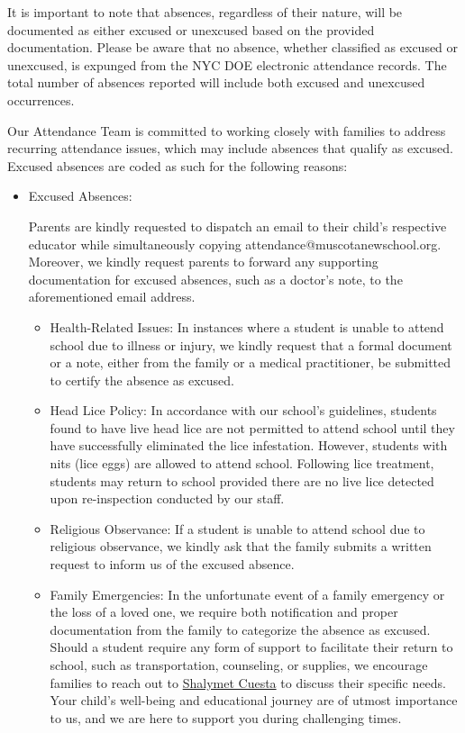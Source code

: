 \documentclass[11pt, letterpaper]{article}
\begin{document}
\begin{itemize}
It is important to note that absences, regardless of their nature, will be documented as either excused or unexcused based on the provided documentation. Please be aware that no absence, whether classified as excused or unexcused, is expunged from the NYC DOE electronic attendance records. The total number of absences reported will include both excused and unexcused occurrences.

Our Attendance Team is committed to working closely with families to address recurring attendance issues, which may include absences that qualify as excused. Excused absences are coded as such for the following reasons:
	\begin{itemize}
	\item Excused Absences: 
	
	Parents are kindly requested to dispatch an email to their child's respective educator while simultaneously copying attendance@muscotanewschool.org. Moreover, we kindly request parents to forward any supporting documentation for excused absences, such as a doctor's note, to the aforementioned email address.
		\begin{itemize}
		\item Health-Related Issues: In instances where a student is unable to attend school due to illness or injury, we kindly request that a formal document or a note, either from the family or a medical practitioner, be submitted to certify the absence as excused.
		\item Head Lice Policy: In accordance with our school's guidelines, students found to have live head lice are not permitted to attend school until they have successfully eliminated the lice infestation. However, students with nits (lice eggs) are allowed to attend school. Following lice treatment, students may return to school provided there are no live lice detected upon re-inspection conducted by our staff.
		\item Religious Observance: If a student is unable to attend school due to religious observance, we kindly ask that the family submits a written request to inform us of the excused absence.
		\item Family Emergencies: In the unfortunate event of a family emergency or the loss of a loved one, we require both notification and proper documentation from the family to categorize the absence as excused. Should a student require any form of support to facilitate their return to school, such as transportation, counseling, or supplies, we encourage families to reach out to \href{https://www.ps192.org/apps/pages/index.jsp?uREC_ID=1199556&type=u}{Shalymet Cuesta} to discuss their specific needs. Your child's well-being and educational journey are of utmost importance to us, and we are here to support you during challenging times.
\end{itemize}
\end{itemize}
\end{itemize}
\end{document}
